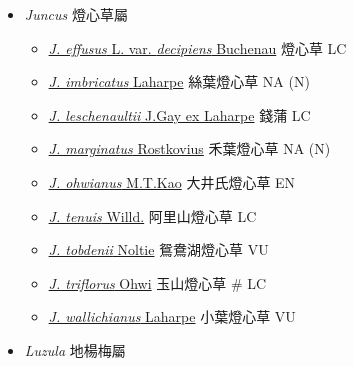 
  \begin{itemize}
 \item[] \textit{Juncus} 燈心草屬
                                
  \begin{itemize}
        \item[] \href{http://www.theplantlist.org/tpl1.1/search?q=Juncus+effusus+var.+decipiens}{\textit{J. effusus} L. var. \textit{decipiens} Buchenau}   燈心草   LC
        \item[] \href{http://www.theplantlist.org/tpl1.1/search?q=Juncus+imbricatus}{\textit{J. imbricatus} Laharpe}   絲葉燈心草   NA (N)
        \item[] \href{http://www.theplantlist.org/tpl1.1/search?q=Juncus+leschenaultii}{\textit{J. leschenaultii} J.Gay ex Laharpe}   錢蒲   LC
        \item[] \href{http://www.theplantlist.org/tpl1.1/search?q=Juncus+marginatus}{\textit{J. marginatus} Rostkovius}   禾葉燈心草   NA (N)
        \item[] \href{http://www.theplantlist.org/tpl1.1/search?q=Juncus+ohwianus}{\textit{J. ohwianus} M.T.Kao}   大井氏燈心草   EN
        \item[] \href{http://www.theplantlist.org/tpl1.1/search?q=Juncus+tenuis}{\textit{J. tenuis} Willd.}   阿里山燈心草   LC
        \item[] \href{http://www.theplantlist.org/tpl1.1/search?q=Juncus+tobdenii}{\textit{J. tobdenii} Noltie}   鴛鴦湖燈心草   VU
        \item[] \href{http://www.theplantlist.org/tpl1.1/search?q=Juncus+triflorus}{\textit{J. triflorus} Ohwi}   玉山燈心草  \# LC
        \item[] \href{http://www.theplantlist.org/tpl1.1/search?q=Juncus+wallichianus}{\textit{J. wallichianus} Laharpe}   小葉燈心草   VU
  \end{itemize}
 \item[] \textit{Luzula} 地楊梅屬
                                

\end{itemize}
